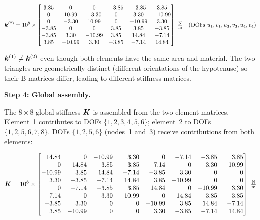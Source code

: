 \begin{example}
\begin{equation}
    \bm{k}^{(2)} = 10^8 \times
    \begin{bmatrix}
         3.85 &  0     &  0     & -3.85  & -3.85  &  3.85  \\
         0    & 10.99  & -3.30  &  0     &  3.30  & -10.99 \\
         0    & -3.30  & 10.99  &  0     & -10.99 &  3.30  \\
        -3.85 &  0     &  0     &  3.85  &  3.85  & -3.85  \\
        -3.85 &  3.30  & -10.99 &  3.85  & 14.84  & -7.14  \\
         3.85 & -10.99 &  3.30  & -3.85  & -7.14  & 14.84
    \end{bmatrix}\ \tfrac{\text{N}}{\text{m}}
    \quad \text{(DOFs }u_1,v_1,u_3,v_3,u_4,v_4\text{)}
    \label{eq:ke2_cst}
\end{equation}

\begin{remark}
$\bm{k}^{(1)} \neq \bm{k}^{(2)}$ even though both elements have the same area
and material. The two triangles are geometrically distinct (different orientations of
the hypotenuse) so their B-matrices differ, leading to different stiffness matrices.
\end{remark}

\medskip
\noindent\textbf{Step 4: Global assembly.}

The $8\times8$ global stiffness $\bm{K}$ is assembled from the two element
matrices. Element~1 contributes to DOFs $\{1,2,3,4,5,6\}$; element~2 to
DOFs $\{1,2,5,6,7,8\}$. DOFs $\{1,2,5,6\}$ (nodes~1 and~3) receive
contributions from both elements:

\begin{equation}
    \stiff = 10^8 \times
    \begin{bmatrix*}[r]
        14.84 &  0     & -10.99 &  3.30  &  0     & -7.14  & -3.85  &  3.85  \\
         0    & 14.84  &  3.85  & -3.85  & -7.14  &  0     &  3.30  & -10.99 \\
       -10.99 &  3.85  & 14.84  & -7.14  & -3.85  &  3.30  &  0     &  0     \\
         3.30 & -3.85  & -7.14  & 14.84  &  3.85  & -10.99 &  0     &  0     \\
         0    & -7.14  & -3.85  &  3.85  & 14.84  &  0     & -10.99 &  3.30  \\
        -7.14 &  0     &  3.30  & -10.99 &  0     & 14.84  &  3.85  & -3.85  \\
        -3.85 &  3.30  &  0     &  0     & -10.99 &  3.85  & 14.84  & -7.14  \\
         3.85 & -10.99 &  0     &  0     &  3.30  & -3.85  & -7.14  & 14.84
    \end{bmatrix*}\ \tfrac{\text{N}}{\text{m}}
    \label{eq:K_cst_global}
\end{equation}


\end{example}
